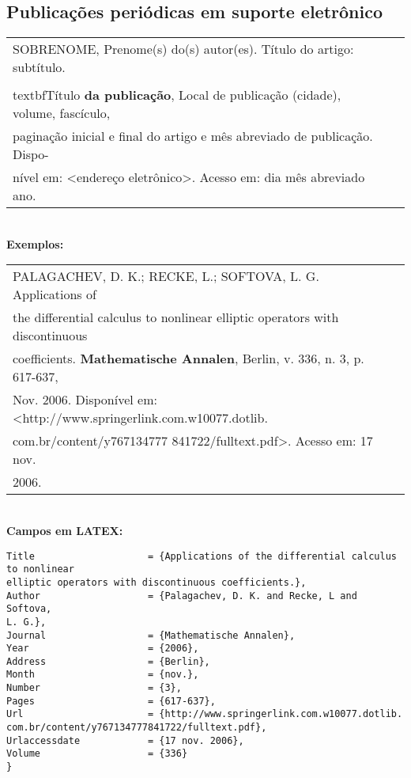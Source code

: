 \subsection{Publicações periódicas em suporte eletrônico}
	
\begin{tabular}{|l|c|} \hline
	SOBRENOME, Prenome(s) do(s) autor(es). Título do artigo: subtítulo. \\\\textbf{Título}  \textbf{da publicação}, Local de publicação (cidade), volume, fascículo, \\paginação inicial e final do artigo e mês abreviado de publicação. Dispo-\\nível em: <endereço eletrônico>. Acesso em: dia mês abreviado ano. \\\hline
\end{tabular} \\
	
\textbf{Exemplos:} \\
	
\begin{tabular}{|l|c|} \hline
	PALAGACHEV, D. K.; RECKE, L.; SOFTOVA, L. G. Applications of                     \\ the
	differential calculus to nonlinear elliptic operators with discontinuous         \\
	coefficients.  \textbf{Mathematische Annalen}, Berlin, v. 336, n. 3, p. 617-637, 
	                                                                                 \\Nov. 2006. Disponível em:
	<http://www.springerlink.com.w10077.dotlib.                                      \\com.br/content/y767134777
	841722/fulltext.pdf>. Acesso em: 17 nov.                                         \\2006. 
	                                                                                 \\\hline
\end{tabular} \\
	
\textbf{Campos em LATEX:} 
	
\begingroup
\fontsize{10pt}{12pt}\selectfont
\begin{verbatim}
Title                    = {Applications of the differential calculus 
to nonlinear
elliptic operators with discontinuous coefficients.},
Author                   = {Palagachev, D. K. and Recke, L and 
Softova, 
L. G.},
Journal                  = {Mathematische Annalen},
Year                     = {2006},
Address                  = {Berlin},
Month                    = {nov.},
Number                   = {3},
Pages                    = {617-637},
Url                      = {http://www.springerlink.com.w10077.dotlib.
com.br/content/y767134777841722/fulltext.pdf},
Urlaccessdate            = {17 nov. 2006},
Volume                   = {336}
}
\end{verbatim}
\endgroup
	
